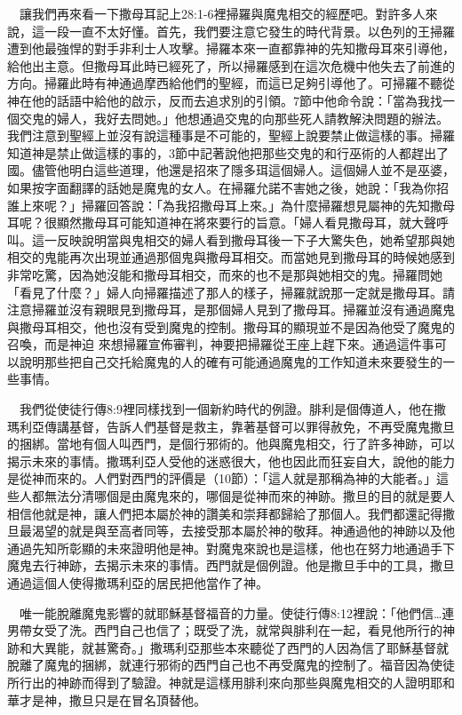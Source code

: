 \documentclass{book}
\begin{document}
　讓我們再來看一下撒母耳記上28:1-6裡掃羅與魔鬼相交的經歷吧。對許多人來說，這一段一直不太好懂。首先，我們要注意它發生的時代背景。以色列的王掃羅遭到他最強悍的對手非利士人攻擊。掃羅本來一直都靠神的先知撒母耳來引導他，給他出主意。但撒母耳此時已經死了，所以掃羅感到在這次危機中他失去了前進的方向。掃羅此時有神通過摩西給他們的聖經，而這已足夠引導他了。可掃羅不聽從神在他的話語中給他的啟示，反而去追求別的引領。7節中他命令說：「當為我找一個交鬼的婦人，我好去問她。」他想通過交鬼的向那些死人請教解決問題的辦法。我們注意到聖經上並沒有說這種事是不可能的，聖經上說要禁止做這樣的事。掃羅知道神是禁止做這樣的事的，3節中記著說他把那些交鬼的和行巫術的人都趕出了國。儘管他明白這些道理，他還是招來了隱多珥這個婦人。這個婦人並不是巫婆，如果按字面翻譯的話她是魔鬼的女人。在掃羅允諾不害她之後，她說：「我為你招誰上來呢？」掃羅回答說：「為我招撒母耳上來。」為什麼掃羅想見屬神的先知撒母耳呢？很顯然撒母耳可能知道神在將來要行的旨意。「婦人看見撒母耳，就大聲呼叫。這一反映說明當與鬼相交的婦人看到撒母耳後一下子大驚失色，她希望那與她相交的鬼能再次出現並通過那個鬼與撒母耳相交。而當她見到撒母耳的時候她感到非常吃驚，因為她沒能和撒母耳相交，而來的也不是那與她相交的鬼。掃羅問她「看見了什麼？」婦人向掃羅描述了那人的樣子，掃羅就說那一定就是撒母耳。請注意掃羅並沒有親眼見到撒母耳，是那個婦人見到了撒母耳。掃羅並沒有通過魔鬼與撒母耳相交，他也沒有受到魔鬼的控制。撒母耳的顯現並不是因為他受了魔鬼的召喚，而是神迫 來想掃羅宣佈審判，神要把掃羅從王座上趕下來。通過這件事可以說明那些把自己交托給魔鬼的人的確有可能通過魔鬼的工作知道未來要發生的一些事情。

　我們從使徒行傳8:9裡同樣找到一個新約時代的例證。腓利是個傳道人，他在撒瑪利亞傳講基督，告訴人們基督是救主，靠著基督可以罪得赦免，不再受魔鬼撒旦的捆綁。當地有個人叫西門，是個行邪術的。他與魔鬼相交，行了許多神跡，可以揭示未來的事情。撒瑪利亞人受他的迷惑很大，他也因此而狂妄自大，說他的能力是從神而來的。人們對西門的評價是（10節）：「這人就是那稱為神的大能者。」這些人都無法分清哪個是由魔鬼來的，哪個是從神而來的神跡。撒旦的目的就是要人相信他就是神，讓人們把本屬於神的讚美和崇拜都歸給了那個人。我們都還記得撒旦最渴望的就是與至高者同等，去接受那本屬於神的敬拜。神通過他的神跡以及他通過先知所彰顯的未來證明他是神。對魔鬼來說也是這樣，他也在努力地通過手下魔鬼去行神跡，去揭示未來的事情。西門就是個例證。他是撒旦手中的工具，撒旦通過這個人使得撒瑪利亞的居民把他當作了神。

　唯一能脫離魔鬼影響的就耶穌基督福音的力量。使徒行傳8:12裡說：「他們信…連男帶女受了洗。西門自己也信了；既受了洗，就常與腓利在一起，看見他所行的神跡和大異能，就甚驚奇。」撒瑪利亞那些本來聽從了西門的人因為信了耶穌基督就脫離了魔鬼的捆綁，就連行邪術的西門自己也不再受魔鬼的控制了。福音因為使徒所行出的神跡而得到了驗證。神就是這樣用腓利來向那些與魔鬼相交的人證明耶和華才是神，撒旦只是在冒名頂替他。
\end{document}
